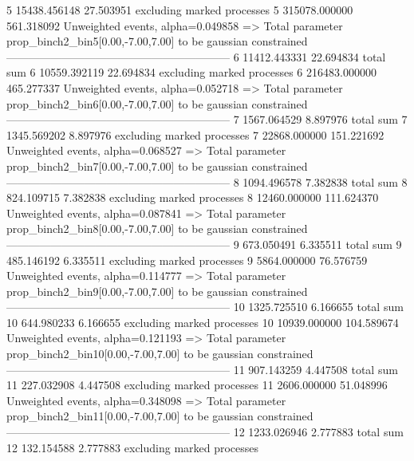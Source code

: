 5          15438.456148    27.503951       excluding marked processes    
5          315078.000000   561.318092      Unweighted events, alpha=0.049858
  => Total parameter prop_binch2_bin5[0.00,-7.00,7.00] to be gaussian constrained
------------------------------------------------------------
6          11412.443331    22.694834       total sum                     
6          10559.392119    22.694834       excluding marked processes    
6          216483.000000   465.277337      Unweighted events, alpha=0.052718
  => Total parameter prop_binch2_bin6[0.00,-7.00,7.00] to be gaussian constrained
------------------------------------------------------------
7          1567.064529     8.897976        total sum                     
7          1345.569202     8.897976        excluding marked processes    
7          22868.000000    151.221692      Unweighted events, alpha=0.068527
  => Total parameter prop_binch2_bin7[0.00,-7.00,7.00] to be gaussian constrained
------------------------------------------------------------
8          1094.496578     7.382838        total sum                     
8          824.109715      7.382838        excluding marked processes    
8          12460.000000    111.624370      Unweighted events, alpha=0.087841
  => Total parameter prop_binch2_bin8[0.00,-7.00,7.00] to be gaussian constrained
------------------------------------------------------------
9          673.050491      6.335511        total sum                     
9          485.146192      6.335511        excluding marked processes    
9          5864.000000     76.576759       Unweighted events, alpha=0.114777
  => Total parameter prop_binch2_bin9[0.00,-7.00,7.00] to be gaussian constrained
------------------------------------------------------------
10         1325.725510     6.166655        total sum                     
10         644.980233      6.166655        excluding marked processes    
10         10939.000000    104.589674      Unweighted events, alpha=0.121193
  => Total parameter prop_binch2_bin10[0.00,-7.00,7.00] to be gaussian constrained
------------------------------------------------------------
11         907.143259      4.447508        total sum                     
11         227.032908      4.447508        excluding marked processes    
11         2606.000000     51.048996       Unweighted events, alpha=0.348098
  => Total parameter prop_binch2_bin11[0.00,-7.00,7.00] to be gaussian constrained
------------------------------------------------------------
12         1233.026946     2.777883        total sum                     
12         132.154588      2.777883        excluding marked processes    
